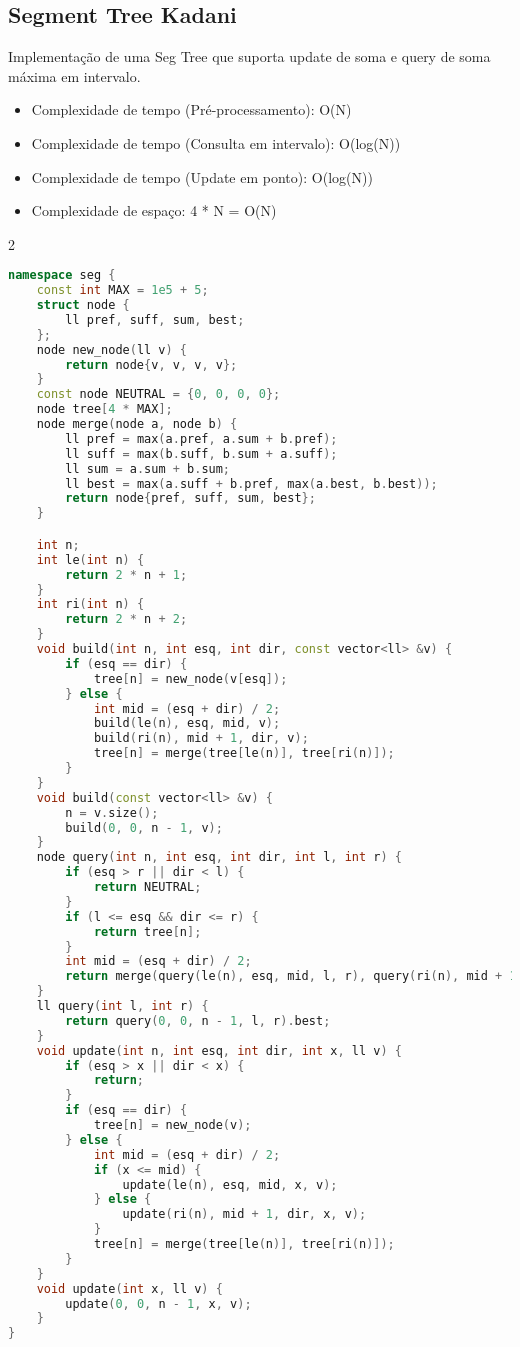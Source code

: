 \documentclass[11pt, a4paper, oneside]{book}
\begin{document}
\hfill

\subsection{Segment Tree Kadani}


Implementação de uma Seg Tree que suporta update de soma e query de soma máxima em intervalo.



\begin{itemize}
\item Complexidade de tempo (Pré-processamento): O(N)
\item Complexidade de tempo (Consulta em intervalo): O(log(N))
\item Complexidade de tempo (Update em ponto): O(log(N))
\item Complexidade de espaço: 4 * N = O(N)
\end{itemize}

\hfill

\begin{multicols}{2}
\begin{lstlisting}[language=C++]
namespace seg {
    const int MAX = 1e5 + 5;
    struct node {
        ll pref, suff, sum, best;
    };
    node new_node(ll v) {
        return node{v, v, v, v};
    }
    const node NEUTRAL = {0, 0, 0, 0};
    node tree[4 * MAX];
    node merge(node a, node b) {
        ll pref = max(a.pref, a.sum + b.pref);
        ll suff = max(b.suff, b.sum + a.suff);
        ll sum = a.sum + b.sum;
        ll best = max(a.suff + b.pref, max(a.best, b.best));
        return node{pref, suff, sum, best};
    }

    int n;
    int le(int n) {
        return 2 * n + 1;
    }
    int ri(int n) {
        return 2 * n + 2;
    }
    void build(int n, int esq, int dir, const vector<ll> &v) {
        if (esq == dir) {
            tree[n] = new_node(v[esq]);
        } else {
            int mid = (esq + dir) / 2;
            build(le(n), esq, mid, v);
            build(ri(n), mid + 1, dir, v);
            tree[n] = merge(tree[le(n)], tree[ri(n)]);
        }
    }
    void build(const vector<ll> &v) {
        n = v.size();
        build(0, 0, n - 1, v);
    }
    node query(int n, int esq, int dir, int l, int r) {
        if (esq > r || dir < l) {
            return NEUTRAL;
        }
        if (l <= esq && dir <= r) {
            return tree[n];
        }
        int mid = (esq + dir) / 2;
        return merge(query(le(n), esq, mid, l, r), query(ri(n), mid + 1, dir, l, r));
    }
    ll query(int l, int r) {
        return query(0, 0, n - 1, l, r).best;
    }
    void update(int n, int esq, int dir, int x, ll v) {
        if (esq > x || dir < x) {
            return;
        }
        if (esq == dir) {
            tree[n] = new_node(v);
        } else {
            int mid = (esq + dir) / 2;
            if (x <= mid) {
                update(le(n), esq, mid, x, v);
            } else {
                update(ri(n), mid + 1, dir, x, v);
            }
            tree[n] = merge(tree[le(n)], tree[ri(n)]);
        }
    }
    void update(int x, ll v) {
        update(0, 0, n - 1, x, v);
    }
}
\end{lstlisting}
\end{multicols}
\end{document}
